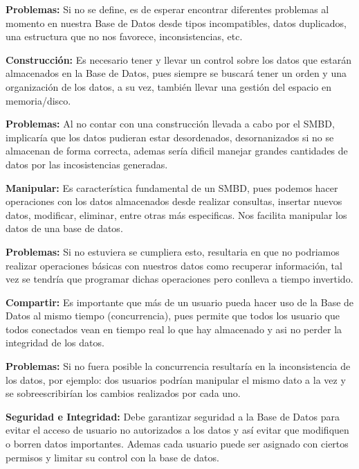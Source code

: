 \documentclass[12pt]{report}
\begin{document}
\begin{enumerate}[label=\textbf{\arabic*.}, leftmargin=*]
\begin{enumerate}[label=\textbf{\alph*.}, leftmargin=*, itemsep=1.0em]
\hspace{0.3cm}\textbf{Problemas:} Si no se define, es de esperar encontrar diferentes problemas al momento en nuestra Base de Datos desde tipos incompatibles, datos duplicados, una estructura que no nos favorece, inconsistencias, etc.
    
    
\textbf{Construcción:}
Es necesario tener y llevar un control sobre los datos que estarán almacenados en la Base de Datos, pues siempre se buscará tener un orden y una organización de los datos, a su vez, también llevar una gestión del espacio en memoria/disco.

\hspace{0.3cm}\textbf{Problemas:} 
Al no contar con una construcción llevada a cabo por el SMBD, implicaría que los datos pudieran estar desordenados, desornanizados si no se almacenan de forma correcta, ademas sería dificil manejar grandes cantidades de datos por las incosistencias generadas. 

    
\textbf{Manipular:}
Es característica fundamental de un SMBD, pues podemos hacer operaciones con los datos almacenados desde realizar consultas, insertar nuevos datos, modificar, eliminar, entre otras más especificas. Nos facilita manipular los datos de una base de datos. 

\hspace{0.3cm}\textbf{Problemas:} 
Si no estuviera se cumpliera esto, resultaria en que no podriamos realizar operaciones básicas con nuestros datos como recuperar información, tal vez se tendría que programar dichas operaciones pero conlleva a tiempo invertido.

    
\textbf{Compartir:}
Es importante que más de un usuario pueda hacer uso de la Base de Datos al mismo tiempo (concurrencia), pues permite que todos los usuario que todos conectados vean en tiempo real lo que hay almacenado y asi no perder la integridad de los datos.

\hspace{0.3cm}\textbf{Problemas:} 
Si no fuera posible la concurrencia resultaría en la inconsistencia de los datos, por ejemplo: dos usuarios podrían manipular el mismo dato a la vez y se sobreescribirían los cambios realizados por cada uno. 
    
\textbf{Seguridad e Integridad:}
Debe garantizar seguridad a la Base de Datos para evitar el acceso de usuario no autorizados a los datos y así evitar que modifiquen o borren datos importantes. Ademas cada usuario puede ser asignado con ciertos permisos y limitar su control con la base de datos.
 

\end{enumerate}
\end{enumerate}
\end{document}
